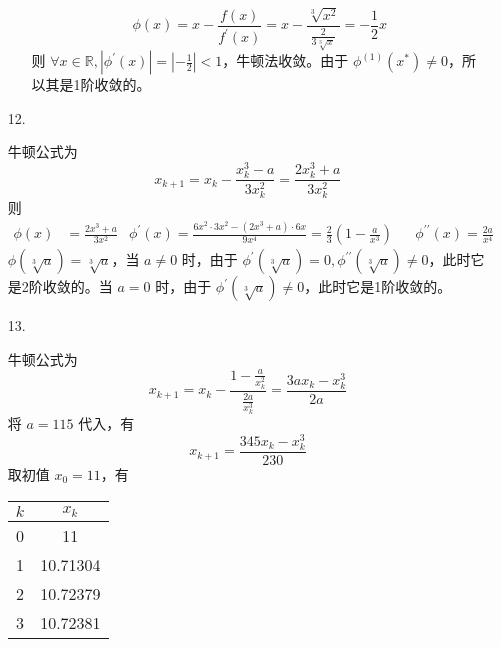 \documentclass{sjtuarticle}
\begin{document}
\begin{itemize}
\begin{solution}
\begin{itemize}
            \begin{equation*}
                \phi(x)=x-\frac{f(x)}{f^\prime(x)}=x-\frac{\sqrt[3]{x^2}}{\frac{2}{3\sqrt[3]{x}}}=-\frac{1}{2}x
            \end{equation*}
            则 $\forall x\in \mathbb{R}, |\phi^\prime(x)|=|-\frac{1}{2}|<1$，牛顿法收敛。由于 $\phi^{(1)}(x^*)\neq 0$，所以其是1阶收敛的。
        \end{itemize}
    \end{solution}
    \item[12.] \begin{solution}
        牛顿公式为
        \begin{equation*}
            x_{k+1}=x_k-\frac{x_k^3-a}{3x_k^2}=\frac{2x_k^3+a}{3x_k^2}
        \end{equation*}
        则
        \begin{align*}
            \phi(x)&=\frac{2x^3+a}{3x^2}& \phi^\prime(x)=\frac{6x^2\cdot 3x^2-(2x^3+a)\cdot 6x}{9x^4}=\frac{2}{3}\left(1-\frac{a}{x^3}\right) & & \phi^{\prime\prime}(x)=\frac{2a}{x^4}
        \end{align*}
        $\phi(\sqrt[3]{a})=\sqrt[3]{a}$，当 $a\neq 0$ 时，由于 $\phi^\prime(\sqrt[3]{a})=0,\phi^{\prime\prime}(\sqrt[3]{a})\neq 0$，此时它是2阶收敛的。当 $a=0$ 时，由于 $\phi^\prime(\sqrt[3]{a})\neq 0$，此时它是1阶收敛的。
    \end{solution}
    \item[13.] \begin{solution} 牛顿公式为
        \begin{equation*}
            x_{k+1}=x_k-\frac{1-\frac{a}{x_k^2}}{\frac{2a}{x_k^3}}=\frac{3ax_k-x_k^3}{2a}
        \end{equation*}
        将 $a=115$ 代入，有
        \begin{equation*}
            x_{k+1}=\frac{345x_k-x_k^3}{230}
        \end{equation*}
        取初值 $x_0=11$，有
        \begin{table}[H]
            \centering
            \begin{tabular}{cc}
                \hline
                $k$ & $x_k$ \\
                \hline
                0 & 11 \\
                1 & 10.71304 \\
                2 & 10.72379 \\
                3 & 10.72381 \\
                \hline
            \end{tabular}
        \end{table}
        

\end{solution}
\end{itemize}
\end{document}
